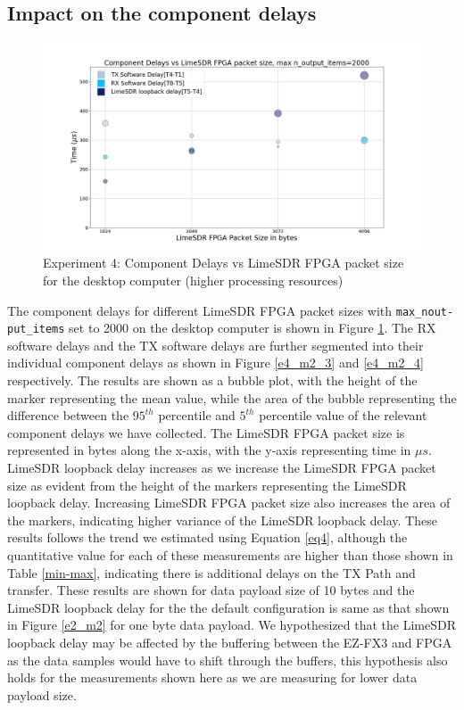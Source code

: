 \subsection{Impact on the component delays}
\begin{figure}[h!]
\centering
\includegraphics[width=\textwidth]{Thesis/Figure/E4M2-2.png}
\caption{Experiment 4: Component Delays vs LimeSDR FPGA packet size for the desktop computer (higher processing resources)}
\label{e4_m2_2}
\end{figure}

The component delays for different LimeSDR FPGA packet sizes with \texttt{max\_nout-\\put\_items} set to 2000 on the desktop computer is shown in Figure \ref{e4_m2_2}.
The RX software delays and the TX software delays are further segmented into their individual component delays as shown in Figure \ref{e4_m2_3} and \ref{e4_m2_4} respectively.
The results are shown as a bubble plot, with the height of the marker representing the mean value, while the area of the bubble representing the difference between the $95^{th}$ percentile and $5^{th}$ percentile value of the relevant component delays we have collected.
The LimeSDR FPGA packet size is represented in bytes along the x-axis, with the y-axis representing time in $\mu s$.\\

LimeSDR loopback delay increases as we increase the LimeSDR FPGA packet size as evident from the height of the markers representing the LimeSDR loopback delay.
Increasing LimeSDR FPGA packet size also increases the area of the markers, indicating higher variance of the LimeSDR loopback delay. 
These results follows the trend we estimated using Equation \ref{eq4}, although the quantitative value for each of these measurements are higher than those shown in Table \ref{min-max}, indicating there is additional delays on the TX Path and transfer.
These results are shown for data payload size of 10 bytes and the LimeSDR loopback delay for the the default configuration is same as that shown in Figure \ref{e2_m2} for one byte data payload.
We hypothesized that the LimeSDR loopback delay may be affected by the buffering between the EZ-FX3 and FPGA as the data samples would have to shift through the buffers, this hypothesis also holds for the measurements shown here as we are measuring for lower data payload size.\\


